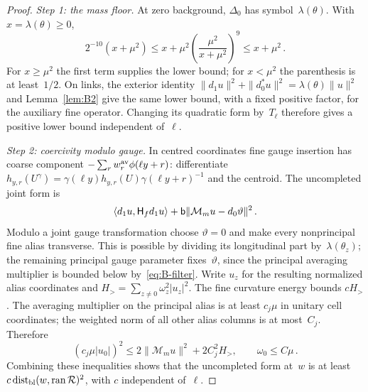 \begin{proof}
\emph{Step 1: the mass floor.} At zero background, $\Delta_0$ has symbol~$\lambda(\theta)$. With $x=\lambda(\theta)\ge0$,
\begin{equation}\label{eq:B-mass-floor}
2^{-10}(x+\mu^2)\le x+\mu^2\left(\frac{\mu^2}{x+\mu^2}\right)^9\le x+\mu^2\,.
\end{equation}
For $x\ge\mu^2$ the first term supplies the lower bound; for $x<\mu^2$ the parenthesis is at least~$1/2$. On links, the exterior identity $\|d_1u\|^2+\|d_0^*u\|^2=\lambda(\theta)\|u\|^2$ and Lemma~\ref{lem:B2} give the same lower bound, with a fixed positive factor, for the auxiliary fine operator. Changing its quadratic form by~$T_\ell$ therefore gives a positive lower bound independent of~$\ell$.

\emph{Step 2: coercivity modulo gauge.} In centred coordinates fine gauge insertion has coarse component $-\sum_r w_r^{\rm av}\phi(\ell y+r)$: differentiate $h_{y,r}(U^\gamma)=\gamma(\ell y)h_{y,r}(U)\gamma(\ell y+r)^{-1}$ and the centroid. The uncompleted joint form is
\begin{equation*}
\langle d_1u,\mathsf H_fd_1u\rangle+\mathsf{b}\|\mathcal M_mu-d_0\vartheta\|^2\,.
\end{equation*}
Modulo a joint gauge transformation choose $\vartheta=0$ and make every nonprincipal fine alias transverse. This is possible by dividing its longitudinal part by~$\lambda(\theta_z)$; the remaining principal gauge parameter fixes~$\vartheta$, since the principal averaging multiplier is bounded below by~\eqref{eq:B-filter}. Write $u_z$ for the resulting normalized alias coordinates and $H_>=\sum_{z\ne0}\omega_z^2|u_z|^2$. The fine curvature energy bounds $cH_>$. The averaging multiplier on the principal alias is at least $c_j\mu$ in unitary cell coordinates; the weighted norm of all other alias columns is at most~$C_j$. Therefore
\begin{equation*}
(c_j\mu|u_0|)^2\le2\|\mathcal M_mu\|^2+2C_j^2H_>,\qquad \omega_0\le C\mu\,.
\end{equation*}
Combining these inequalities shows that the uncompleted form at~$w$ is at least $c\operatorname{dist}_{\rm bl}(w,\operatorname{ran}\mathcal R)^2$, with $c$ independent of~$\ell$.


\end{proof}
